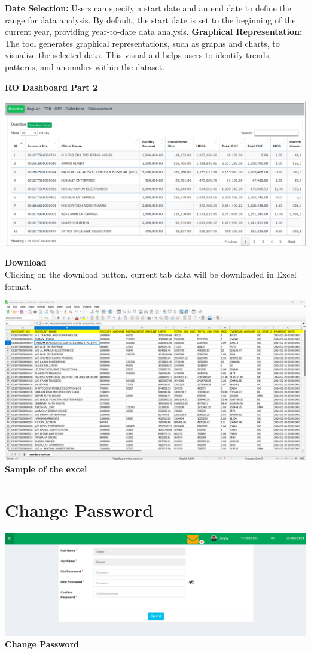 \documentclass{article}
\begin{document}
\textbf{Date Selection:} Users can specify a start date and an end date to define the range for data analysis. By default, the start date is set to the beginning of the current year, providing year-to-date data analysis.
\textbf{Graphical Representation:} The tool generates graphical representations, such as graphs and charts, to visualize the selected data. This visual aid helps users to identify trends, patterns, and anomalies within the dataset.



\textbf{RO Dashboard Part 2}
\begin{center}
\includegraphics[width=1.0\textwidth]{image/ro_2.png}
\end{center}

\textbf{Download}\\
Clicking on the download button, current tab data will be downloaded in Excel format. 

\begin{center}
\includegraphics[width=1.0\textwidth]{image/ro_6_sample_excel.png}
\textbf{Sample of the excel}
\end{center}

\section{Change Password}
\begin{center}
\includegraphics[width=1.0\textwidth]{image/change_password.png}
\textbf{Change Password}
\end{center}
\end{document}
